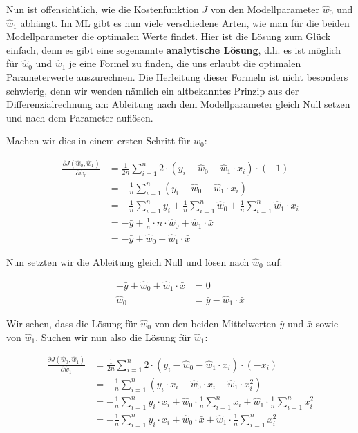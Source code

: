 \documentclass[
]{book}
\begin{document}
Nun ist offensichtlich, wie die Kostenfunktion \(J\) von den Modellparameter \(\hat{w}_0\) und \(\hat{w}_1\) abhängt. Im ML gibt es nun viele verschiedene Arten, wie man für die beiden Modellparameter die optimalen Werte findet. Hier ist die Lösung zum Glück einfach, denn es gibt eine sogenannte \textbf{analytische Lösung}, d.h. es ist möglich für \(\hat{w}_0\) und \(\hat{w}_1\) je eine Formel zu finden, die uns erlaubt die optimalen Parameterwerte auszurechnen. Die Herleitung dieser Formeln ist nicht besonders schwierig, denn wir wenden nämlich ein altbekanntes Prinzip aus der Differenzialrechnung an: Ableitung nach dem Modellparameter gleich Null setzen und nach dem Parameter auflösen.

Machen wir dies in einem ersten Schritt für \(\hat{w}_0\):

\begin{align}
\frac{\partial J(\hat{w}_0, \hat{w}_1)}{\partial \hat{w}_0} &= \frac{1}{2n} \sum_{i=1}^{n} 2 \cdot \left(y_i - \hat{w}_0 - \hat{w}_1 \cdot x_i \right) \cdot (-1) \\
&= -\frac{1}{n} \sum_{i=1}^{n} \left(y_i - \hat{w}_0 - \hat{w}_1 \cdot x_i \right) \\
&= -\frac{1}{n} \sum_{i=1}^{n} y_i +  \frac{1}{n} \sum_{i=1}^{n} \hat{w}_0 + \frac{1}{n} \sum_{i=1}^{n} \hat{w}_1 \cdot x_i \\
&= -\bar{y} + \frac{1}{n} \cdot n \cdot \hat{w}_0 + \hat{w}_1 \cdot \bar{x} \\
&= -\bar{y} + \hat{w}_0 + \hat{w}_1 \cdot \bar{x}
\end{align}

Nun setzten wir die Ableitung gleich Null und lösen nach \(\hat{w}_0\) auf:

\begin{align}
-\bar{y} + \hat{w}_0 + \hat{w}_1 \cdot \bar{x} &= 0 \\
\hat{w}_0 &= \bar{y} - \hat{w}_1 \cdot \bar{x}
\end{align}

Wir sehen, dass die Lösung für \(\hat{w}_0\) von den beiden Mittelwerten \(\bar{y}\) und \(\bar{x}\) sowie von \(\hat{w}_1\). Suchen wir nun also die Lösung für \(\hat{w}_1\):

\begin{align}
\frac{\partial J(\hat{w}_0, \hat{w}_1)}{\partial \hat{w}_1} &= \frac{1}{2n} \sum_{i=1}^{n} 2 \cdot \left(y_i - \hat{w}_0 - \hat{w}_1 \cdot x_i \right) \cdot (-x_i) \\
&= -\frac{1}{n} \sum_{i=1}^{n} \left(y_i \cdot x_i - \hat{w}_0 \cdot x_i - \hat{w}_1 \cdot x_i^2 \right) \\
&= -\frac{1}{n} \sum_{i=1}^{n} y_i \cdot x_i + \hat{w}_0 \cdot \frac{1}{n} \sum_{i=1}^{n} x_i + \hat{w}_1 \cdot \frac{1}{n} \sum_{i=1}^{n} x_i^2 \\
&= -\frac{1}{n} \sum_{i=1}^{n} y_i \cdot x_i + \hat{w}_0 \cdot \bar{x} + \hat{w}_1 \cdot \frac{1}{n} \sum_{i=1}^{n} x_i^2 \\
\end{align}
\end{document}
